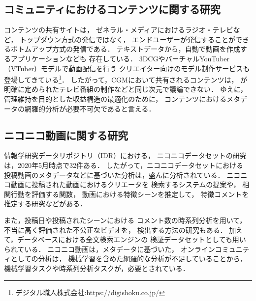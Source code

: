 \documentclass[submit,techrep,noauthor]{ipsj}
\begin{document}
\subsection{コミュニティにおけるコンテンツに関する研究}\label{portal}

コンテンツの共有サイトは，
ゼネラル・メディアにおけるラジオ・テレビなど，
トップダウン方式の発信ではなく，
エンドユーザーが発信することができるボトムアップ方式の発信である．
%
テキストデータから，自動で動画を作成するアプリケーションなども
存在している\cite{people_touched}\cite{interactive_content}\cite{t2v_paper}．
%
3DCGやバーチャルYouTuber（VTuber）モデルで動画配信を行う
クリエイター向けのモデル制作サービスも登場してきている\footnote{デジタル職人株式会社:https://digishoku.co.jp/}．
%
したがって，CGMにおいて共有されるコンテンツは，
が明確に定められたテレビ番組の制作などと同じ次元で議論できない．
%
%
ゆえに，管理維持を目的とした収益構造の最適化のために，
コンテンツにおけるメタデータの網羅的分析が必要不可欠であると言える．

\subsection{ニコニコ動画に関する研究}
情報学研究データリポジトリ（IDR）における，
ニコニコデータセットの研究は，2020年5月時点で32件ある．
したがって，ニコニコデータセットにおける
投稿動画のメタデータなどに基づいた分析は，盛んに分析されている．
%
ニコニコ動画に投稿された動画におけるクリエータを
検索するシステムの提案\cite{vocaloid_niconico}や，
相関行動を評価する関数\cite{evaluation_niconico}，
動画における特徴シーンを推定して，
特徴コメントを推定する研究\cite{comment_niconico}などがある．

また，投稿日や投稿されたシーンにおける
コメント数の時系列分析を用いて，
不当に高く評価された不公正なビデオを，
検出する方法の研究\cite{socialmedia_niconico}もある．
%
加えて，データベースにおける全文検索エンジンの
検証データセットとしても用いられている\cite{postgres_niconico}．
%
%
ニコニコ動画は，メタデータに基づいた，
オンラインコミュニティとしての分析は，
機械学習を含めた網羅的な分析が不足していることから，
機械学習タスクや時系列分析タスクが，必要とされている．
\end{document}
